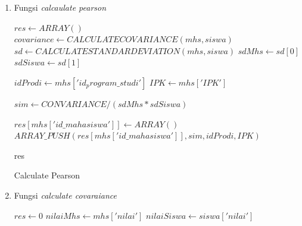 \begin{enumerate}
    \item Fungsi \textit{calcaulate pearson}\\
    
        \begin{algorithm}[H]
            \begin{algorithmic}[1]
                    \State $res \gets ARRAY()$
                        \State $covariance \gets CALCULATECOVARIANCE(mhs, siswa)$
                        \State $sd \gets CALCULATESTANDARDEVIATION(mhs,siswa)$
                        \State $sdMhs \gets sd[0]$
                        \State $sdSiswa \gets sd[1]$
                        
                        \State $idProdi \gets mhs['id_program\_studi']$
                        \State $IPK \gets mhs['IPK']$
                        
                        \State $sim \gets CONVARIANCE / (sdMhs * sdSiswa)$
                        
                            \State $res[mhs['id\_mahasiswa']] \gets ARRAY()$
                            \State $ARRAY\_PUSH(res[mhs['id\_mahasiswa']], sim, idProdi, IPK)$
                        \EndIf
                    \EndFor
                
                    \State \Return res
                \EndProcedure
            \end{algorithmic} 
            \caption{Calculate Pearson}
            \label{alg:calculatePearson}
        \end{algorithm}
        
    \item Fungsi \textit{calculate covaraiance}\\
        
        \begin{algorithm}[H]
            \begin{algorithmic}[1]
                    \State $res \gets 0$
                    \State $nilaiMhs \gets mhs['nilai']$
                    \State $nilaiSiswa \gets siswa['nilai']$
                    

\end{algorithmic}
\end{algorithm}
\end{enumerate}
